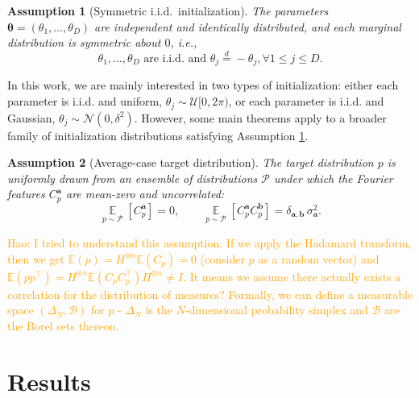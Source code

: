 \documentclass[a4paper,onecolumn,notitlepage,nofootinbib,longbibliography,superscriptaddress, floatfix, pra, aps, 10pt]{revtex4-2}
\newcommand{\vttheta}{{\bm{\theta}}}
\newcommand{\vta}{{\bm{a}}}
\newcommand{\vtb}{{\bm{b}}}
\newtheorem{assumption}{Assumption}
\newcommand\hw[1]{\textcolor{orange}{Hao: #1}}
\begin{document}
\begin{assumption}[Symmetric i.i.d.\ initialization]
\label{ass:symm-iid-init}
The parameters $\vttheta=(\theta_1,\dots,\theta_D)$ are independent and identically distributed, and each marginal distribution is symmetric about $0$, i.e.,
\begin{equation}
\theta_1,\dots,\theta_D \text{ are i.i.d. and }
\theta_j \stackrel{d}{=} -\theta_j,\forall 1 \leq j \leq D.
\end{equation}
\end{assumption}
In this work, we are mainly interested in two types of initialization: either each parameter is i.i.d. and uniform, $\theta_j \sim \mathcal{U}[0,2\pi)$, or each parameter is i.i.d. and Gaussian, $\theta_j \sim \mathcal{N}(0,\delta^2)$. However, some main theorems apply to a broader family of initialization distributions satisfying Assumption \ref{ass:symm-iid-init}.

\begin{assumption}[Average-case target distribution]
\label{ass:avgcase-target}
The target distribution $p$ is uniformly drawn from an ensemble of distributions $\mathcal P$ under which the Fourier features $C_p^{\vta}$ are mean-zero and uncorrelated:
\begin{equation}
\operatorname*{\mathbb {E}}_{p\sim\mathcal {P}}[C_p^{\vta}]=0,
\qquad
\operatorname*{\mathbb {E}}_{p\sim\mathcal {P}}\!\left[C_p^{\vta}C_p^{\vtb}\right]=\delta_{\vta,\vtb}\,\sigma_{\vta}^2.
\end{equation}

\end{assumption}
\hw{I tried to understand this assumption. If we apply the Hadamard transform, then we get $\mathbb{E}(p) = H^{\otimes n}\mathbb{E}(C_p) = 0$ (consider $p$ as a random vector) and $\mathbb{E}(pp^\top) = H^{\otimes n}\mathbb{E}(C_pC_p^\top) H^{\otimes n} \neq I$. It means we assume there actually exists a correlation for the distribution of measures? Formally, we can define a measurable space $(\Delta_N, \mathcal{B})$ for $p$ - $\Delta_N$ is the $N$-dimensional probability simplex and $\mathcal{B}$ are the Borel sets thereon.}



\section{Results}
\end{document}

